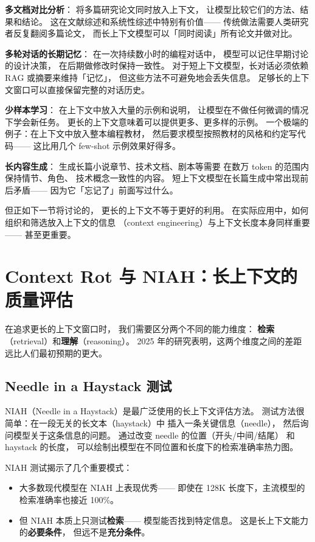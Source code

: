 \textbf{多文档对比分析}：
将多篇研究论文同时放入上下文，
让模型比较它们的方法、结果和结论。
这在文献综述和系统性综述中特别有价值——
传统做法需要人类研究者反复翻阅多篇论文，
而长上下文模型可以「同时阅读」所有论文并做对比。

\textbf{多轮对话的长期记忆}：
在一次持续数小时的编程对话中，
模型可以记住早期讨论的设计决策，
在后期做修改时保持一致性。
对于短上下文模型，长对话必须依赖
RAG 或摘要来维持「记忆」，
但这些方法不可避免地会丢失信息。
足够长的上下文窗口可以直接保留完整的对话历史。

\textbf{少样本学习}：
在上下文中放入大量的示例和说明，
让模型在不做任何微调的情况下学会新任务。
更长的上下文意味着可以提供更多、更多样的示例。
一个极端的例子：在上下文中放入整本编程教材，
然后要求模型按照教材的风格和约定写代码——
这比用几个 few-shot 示例效果好得多。

\textbf{长内容生成}：
生成长篇小说章节、技术文档、剧本等需要
在数万 token 的范围内保持情节、角色、
技术概念一致性的内容。
短上下文模型在长篇生成中常出现前后矛盾——
因为它「忘记了」前面写过什么。

但正如下一节将讨论的，
更长的上下文不等于更好的利用。
在实际应用中，如何组织和筛选放入上下文的信息
（context engineering）与上下文长度本身同样重要——
甚至更重要。

\section{Context Rot 与 NIAH：长上下文的质量评估}

在追求更长的上下文窗口时，
我们需要区分两个不同的能力维度：
\textbf{检索}（retrieval）和\textbf{理解}（reasoning）。
2025 年的研究表明，这两个维度之间的差距
远比人们最初预期的更大。

\subsection{Needle in a Haystack 测试}

NIAH（Needle in a Haystack）是最广泛使用的长上下文评估方法。
测试方法很简单：在一段无关的长文本（haystack）中
插入一条关键信息（needle），
然后询问模型关于这条信息的问题。
通过改变 needle 的位置（开头/中间/结尾）
和 haystack 的长度，
可以绘制出模型在不同位置和长度下的检索准确率热力图。

NIAH 测试揭示了几个重要模式：
\begin{itemize}[noitemsep]
  \item 大多数现代模型在 NIAH 上表现优秀——
        即使在 128K 长度下，主流模型的检索准确率也接近 100\%。
  \item 但 NIAH 本质上只测试\textbf{检索}——
        模型能否找到特定信息。
        这是长上下文能力的\textbf{必要条件}，
        但远不是\textbf{充分条件}。
\end{itemize}

